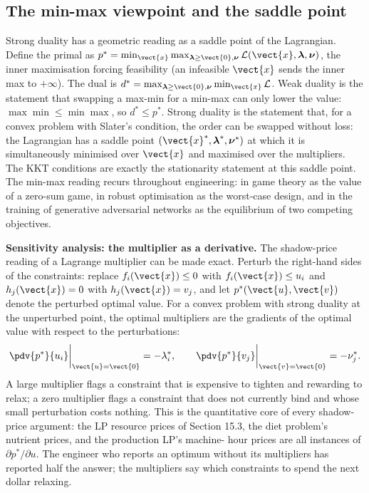 

\subsection{The min-max viewpoint and the saddle point}

Strong duality has a geometric reading as a saddle point of the
Lagrangian. Define the primal as $p^{*} = \min_{\vect{x}}
\max_{\boldsymbol{\lambda} \geq \vect{0}, \boldsymbol{\nu}}
\mathcal{L}(\vect{x}, \boldsymbol{\lambda}, \boldsymbol{\nu})$, the
inner maximisation forcing feasibility (an infeasible $\vect{x}$
sends the inner max to $+\infty$). The dual is $d^{*} =
\max_{\boldsymbol{\lambda} \geq \vect{0}, \boldsymbol{\nu}}
\min_{\vect{x}} \mathcal{L}$. Weak duality is the statement that
swapping a max-min for a min-max can only lower the value:
$\max \min \leq \min \max$, so $d^{*} \leq p^{*}$. Strong duality
is the statement that, for a convex problem with Slater's
condition, the order can be swapped without loss: the Lagrangian
has a saddle point $(\vect{x}^{*}, \boldsymbol{\lambda}^{*},
\boldsymbol{\nu}^{*})$ at which it is simultaneously minimised over
$\vect{x}$ and maximised over the multipliers. The KKT conditions
are exactly the stationarity statement at this saddle point. The
min-max reading recurs throughout engineering: in game theory as
the value of a zero-sum game, in robust optimisation as the
worst-case design, and in the training of generative adversarial
networks as the equilibrium of two competing objectives.

\begin{mastery}
\textbf{Sensitivity analysis: the multiplier as a derivative.} The
shadow-price reading of a Lagrange multiplier can be made exact.
Perturb the right-hand sides of the constraints: replace
$f_{i}(\vect{x}) \leq 0$ with $f_{i}(\vect{x}) \leq u_{i}$ and
$h_{j}(\vect{x}) = 0$ with $h_{j}(\vect{x}) = v_{j}$, and let
$p^{*}(\vect{u}, \vect{v})$ denote the perturbed optimal value.
For a convex problem with strong duality at the unperturbed point,
the optimal multipliers are the gradients of the optimal value
with respect to the perturbations:
\[
\pdv{p^{*}}{u_{i}}\bigg|_{\vect{u} = \vect{0}} = -\lambda_{i}^{*},
\qquad
\pdv{p^{*}}{v_{j}}\bigg|_{\vect{v} = \vect{0}} = -\nu_{j}^{*}.
\]
A large multiplier flags a constraint that is expensive to
tighten and rewarding to relax; a zero multiplier flags a
constraint that does not currently bind and whose small
perturbation costs nothing. This is the quantitative core of every
shadow-price argument: the LP resource prices of Section 15.3, the
diet problem's nutrient prices, and the production LP's machine-
hour prices are all instances of $\partial p^{*} / \partial u$.
The engineer who reports an optimum without its multipliers has
reported half the answer; the multipliers say which constraints to
spend the next dollar relaxing.
\end{mastery}

